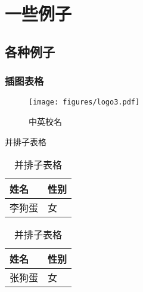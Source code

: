 \chapter{一些例子}
\section{各种例子}
\subsection{插图表格}
\begin{figure}[htbp]
    \centering\texttt{[image: figures/logo3.pdf]}
    \caption[中英校名]{中英校名}
\end{figure}
\begin{table}[htbp]
    \noindent\begin{minipage}{0.5\textwidth}
        \centering
        \caption{并排子表格}
        \label{tab:parallel1}
        \begin{tabular}{p{2cm}p{2cm}}
            \toprule[1.5pt]
            姓名 & 性别 \\\midrule[1pt]
            李狗蛋 & 女 \\\bottomrule[1.5pt]
        \end{tabular}
    \end{minipage}
    \begin{minipage}{0.5\textwidth}
        \centering
        \caption{并排子表格}
        \label{tab:parallel2}
        \begin{tabular}{p{2cm}p{2cm}}
            \toprule[1.5pt]
            姓名 & 性别 \\\midrule[1pt]
            张狗蛋 & 女 \\\bottomrule[1.5pt]
        \end{tabular}
    \end{minipage}
\end{table}
\begin{table}[htbp]
    \centering
    \caption{并排子表格}
    \label{tab:subtable}
    \hskip2cm
\end{table}

